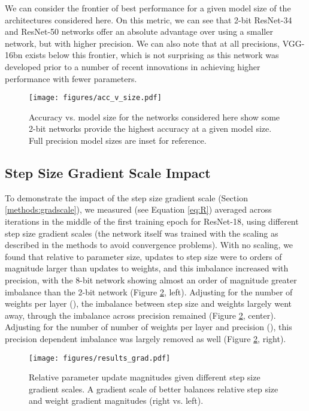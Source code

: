 \documentclass{article}
\begin{document}
We can consider the frontier of best performance for a given model size of the architectures considered here.
On this metric, we can see that 2-bit ResNet-34 and ResNet-50 networks offer an absolute advantage over using a smaller network, but with higher precision.
We can also note that at all precisions, VGG-16bn exists below this frontier, which is not surprising as this network was developed prior to a number of recent innovations in achieving higher performance with fewer parameters.


\begin{figure}[ht]
\begin{center}
  	\centerline{\texttt{[image: figures/acc\_v\_size.pdf]}}
  \caption{
  	Accuracy vs. model size for the networks considered here show some 2-bit networks provide the highest accuracy at a given model size.  Full precision model sizes are inset for reference.
}
    	\label{fig:acc_v_size}
  	\end{center}
\end{figure}




\subsection{Step Size Gradient Scale Impact}
\label{sec:gradscaleres}

To demonstrate the impact of the step size gradient scale (Section \ref{methods:gradscale}), we measured  (see Equation \ref{eq:R}) averaged across  iterations in the middle of the first training epoch for ResNet-18,
using different step size gradient scales (the network itself was trained with the scaling as described in the methods to avoid convergence problems).
With no scaling, we found that relative to parameter size, updates to step size were  to  orders of magnitude larger than updates to weights, and this imbalance increased with precision, with the 8-bit network showing almost an order of magnitude greater imbalance than the 2-bit network (Figure \ref{fig:results_grad}, left). Adjusting for the number of weights per layer (), the imbalance between step size and weights largely went away, through the imbalance across precision remained (Figure \ref{fig:results_grad}, center).
Adjusting for the number of number of weights per layer and precision (), this precision dependent imbalance was largely removed as well (Figure \ref{fig:results_grad}, right).
 
\begin{figure}[ht]
\begin{center}
  	\centerline{\texttt{[image: figures/results\_grad.pdf]}}
  \caption{
	Relative parameter update magnitudes given different step size gradient scales.  A gradient scale of  better balances relative step size and weight gradient magnitudes (right vs. left).
}
    	\label{fig:results_grad}
  	\end{center}
\end{figure}
\end{document}
